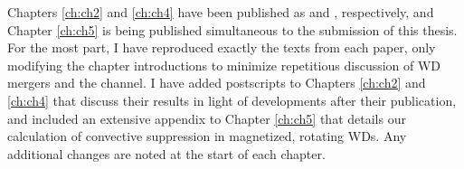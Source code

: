 Chapters \ref{ch:ch2} and \ref{ch:ch4} have been published as \cite{zhu+13} and \cite{zhu+15}, respectively, and Chapter \ref{ch:ch5} is being published simultaneous to the submission of this thesis.  For the most part, I have reproduced exactly the texts from each paper, only modifying the chapter introductions to minimize repetitious discussion of WD mergers and the \citeal{vkercj10} channel.  I have added postscripts to Chapters \ref{ch:ch2} and \ref{ch:ch4} that discuss their results in light of developments after their publication, and included an extensive appendix to Chapter \ref{ch:ch5} that details our calculation of convective suppression in magnetized, rotating WDs.  Any additional changes are noted at the start of each chapter.

